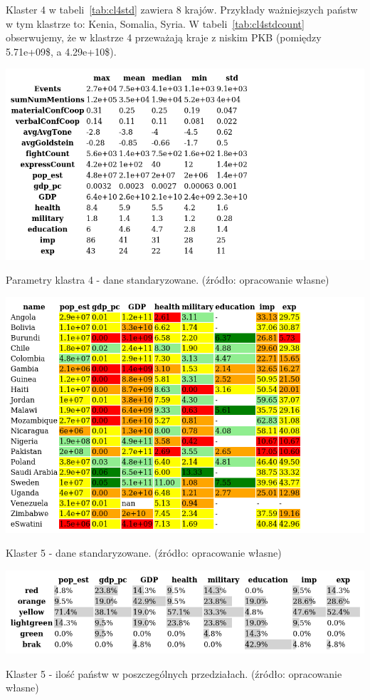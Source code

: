 \documentclass[11pt]{report}
\begin{document}
    Klaster 4 w tabeli~\ref{tab:cl4std} zawiera 8 krajów.
    Przykłady ważniejszych państw w tym klastrze to: Kenia, Somalia, Syria.
    W tabeli~\ref{tab:cl4stdcount} obserwujemy, że w klastrze 4 przeważają kraje z niskim PKB (pomiędzy 5.71e+09\$, a 4.29e+10\$).

    \begin{table}[!htp]
        \centering
        \includegraphics[width=\linewidth]{tables/CLUST/desc/clust4std_desc.png}
        \caption{Parametry klastra 4 - dane standaryzowane. (źródło: opracowanie własne)}
        \label{tab:cl4std_desc}
    \end{table}

    \begin{table}[!htp]
        \centering
        \includegraphics[width=\linewidth]{tables/CLUST/cluster5stdkmeans.png}
        \caption{Klaster 5 - dane standaryzowane. (źródło: opracowanie własne)}
        \label{tab:cl5std}
    \end{table}

    \begin{table}[!htp]
        \centering
        \includegraphics[width=\linewidth]{tables/CLUST/cluster5stdkmeanscount.png}
        \caption{Klaster 5 - ilość państw w poszczególnych przedziałach. (źródło: opracowanie własne)}
        \label{tab:cl5stdcount}
    \end{table}
\end{document}
